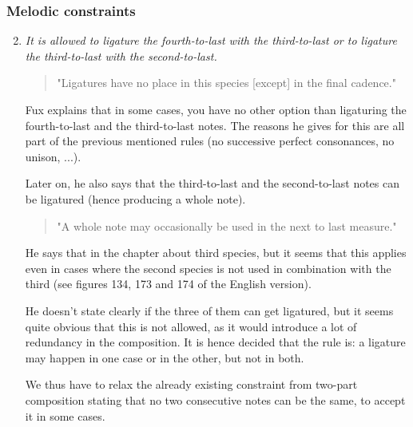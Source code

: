 \subsubsection{Melodic constraints}
\begin{enumerate}[wide, label=\bfseries 2.M\arabic*]
\setcounter{enumi}{1} %
    \item \textit{It is allowed to ligature the fourth-to-last with the third-to-last or to ligature the third-to-last with the second-to-last.} \label{rule:2nd-species-ligatures}    
    \begin{quotation}
        "Ligatures have no place in this species [except] in the final cadence."
        \textcite[p.87]{GaPEng}
    \end{quotation}
    Fux explains that in some cases, you have no other option than ligaturing the fourth-to-last and the third-to-last notes. The reasons he gives for this are all part of the previous mentioned rules (no successive perfect consonances, no unison, ...).

    Later on, he also says that the third-to-last and the second-to-last notes can be ligatured (hence producing a whole note).
    \begin{quotation}
        "A whole note may occasionally be used in the next to last measure."
        \textcite[p.93]{GaPEng}
    \end{quotation}
    He says that in the chapter about third species, but it seems that this applies even in cases where the second species is not used in combination with the third (see figures 134, 173 and 174 of the English version).

    He doesn't state clearly if the three of them can get ligatured, but it seems quite obvious that this is not allowed, as it would introduce a lot of redundancy in the composition. It is hence decided that the rule is: a ligature may happen in one case or in the other, but not in both.

    We thus have to relax the already existing constraint from two-part composition stating that no two consecutive notes can be the same, to accept it in some cases.
\end{enumerate}

